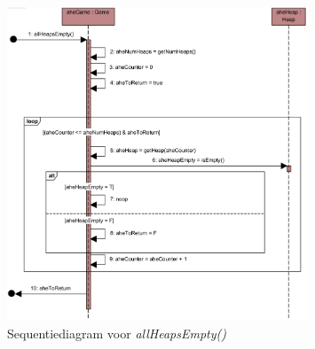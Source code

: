 
\begin{figure}
	\includegraphics[width=0.8\textwidth]{chap-evaluatie/allHeapsEmpty.png}
	\caption{Sequentiediagram voor \textit{allHeapsEmpty()}}
	\label{fig:nim-allHeapsEmpty}
\end{figure}

